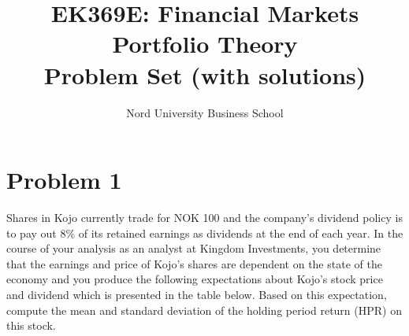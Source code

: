\documentclass[10]{article}
\title{EK369E: Financial Markets\\ Portfolio Theory\\Problem Set (with solutions)}
\author{Nord University Business School}
\date{}
\begin{document}
\maketitle


\section*{Problem 1}
Shares in Kojo currently trade for NOK 100 and the company's dividend policy is to pay out 8\% of its retained earnings as dividends at the end of each year. In the course of your analysis as an analyst at Kingdom Investments, you determine that the earnings and price of Kojo's shares are dependent on the state of the economy and 
you produce the following expectations about Kojo's stock price and dividend which is presented in the table below. Based on this expectation, compute the mean and standard deviation of the holding period return (HPR) on this stock.

\begin{table}[H]
\label{tab:my-table}
\end{table}
\end{document}
